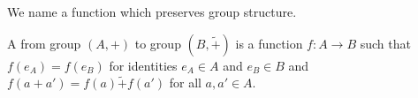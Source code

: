 
\sbasic




\sstart



We name a function which preserves group structure.



A  from group
$(A, +)$ to group $(B, \tilde{+})$
is a function $f: A \to B$ such that
$f(e_A) = f(e_B)$ for identities $e_A \in A$
and $e_B \in B$ and $f(a + a') = f(a) \tilde{+} f(a')$
for all $a, a' \in A$.



\strats
